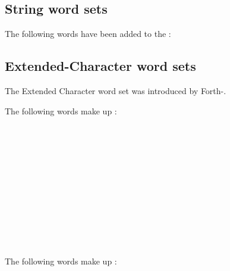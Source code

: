 
\subsection{String word sets}
The following words have been added to the :

\begin{minipage}[t]{0.3\linewidth}
\end{minipage}
\hfill
\begin{minipage}[t]{0.3\linewidth}
\end{minipage}
\hfill
\begin{minipage}[t]{0.3\linewidth}
\end{minipage}

\subsection{Extended-Character word sets}
The Extended Character word set was introduced by Forth-\snapshot.

The following words make up :

\begin{minipage}[t]{0.25\linewidth}
	 \\
	 \\
	 \\
\end{minipage}
\hfill
\begin{minipage}[t]{0.25\linewidth}
	 \\
	 \\
	 \\
\end{minipage}
\hfill
\begin{minipage}[t]{0.4\linewidth}
	 \\
	 \\
	 \\
\end{minipage}

The following words make up :

